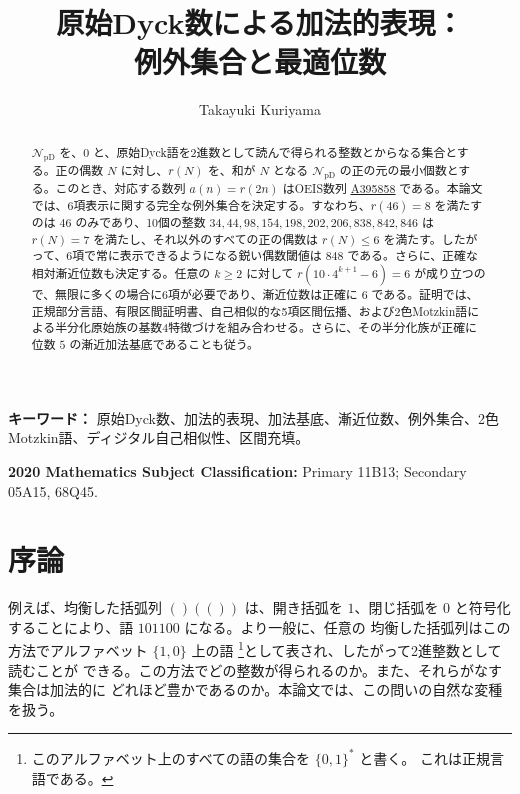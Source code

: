 \documentclass[12pt]{ltjsarticle}
\title{原始Dyck数による加法的表現：\\例外集合と最適位数}
\author{Takayuki Kuriyama}
\date{}
\theoremstyle{plain}
\theoremstyle{definition}
\theoremstyle{plain}
\newcommand{\NpD}{\mathcal{N}_{\mathrm{pD}}}
\newcommand{\seqnum}[1]{\href{https://oeis.org/#1}{\textrm{\underline{#1}}}}
\begin{document}
\maketitle

\begin{abstract}
$\NpD$ を、$0$ と、原始Dyck語を2進数として読んで得られる整数とからなる集合とする。正の偶数 $N$ に対し、$r(N)$ を、和が $N$ となる $\NpD$ の正の元の最小個数とする。このとき、対応する数列 $a(n)=r(2n)$ はOEIS数列 \seqnum{A395858} である。本論文では、6項表示に関する完全な例外集合を決定する。すなわち、$r(46)=8$ を満たすのは $46$ のみであり、10個の整数
$34,44,98,154,198,202,206,838,842,846$ は $r(N)=7$ を満たし、それ以外のすべての正の偶数は $r(N)\leq6$ を満たす。したがって、6項で常に表示できるようになる鋭い偶数閾値は $848$ である。さらに、正確な相対漸近位数も決定する。任意の $k\geq2$ に対して
$r(10\cdot4^{k+1}-6)=6$ が成り立つので、無限に多くの場合に6項が必要であり、漸近位数は正確に $6$ である。証明では、正規部分言語、有限区間証明書、自己相似的な5項区間伝播、および2色Motzkin語による半分化原始族の基数4特徴づけを組み合わせる。さらに、その半分化族が正確に位数 $5$ の漸近加法基底であることも従う。
\end{abstract}

\noindent\textbf{キーワード：} 原始Dyck数、加法的表現、加法基底、漸近位数、例外集合、2色Motzkin語、ディジタル自己相似性、区間充填。

\noindent\textbf{2020 Mathematics Subject Classification:} Primary 11B13;
Secondary 05A15, 68Q45.

\section{序論}\label{sec:introduction}

例えば、均衡した括弧列 $()(())$ は、開き括弧を $1$、閉じ括弧を
$0$ と符号化することにより、語 $101100$ になる。より一般に、任意の
均衡した括弧列はこの方法でアルファベット $\{1,0\}$ 上の語
\footnote{このアルファベット上のすべての語の集合を $\{0,1\}^*$ と書く。
これは正規言語である。}として表され、したがって2進整数として読むことが
できる。この方法でどの整数が得られるのか。また、それらがなす集合は加法的に
どれほど豊かであるのか。本論文では、この問いの自然な変種を扱う。
\end{document}
